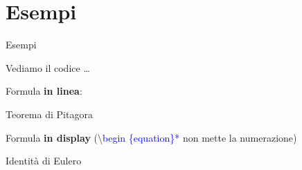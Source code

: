 \section{Esempi}
  \begin{frame}{Esempi}

    Vediamo il codice \dots

    Formula \textbf{in linea}:

    \begin{exampleblock}{Teorema di Pitagora}
      
    \end{exampleblock}

    Formula \textbf{in display} (\textbackslash \textcolor{blue}{begin \{equation\}*} non mette la numerazione)

    \begin{exampleblock}{Identità di Eulero}
      
    \end{exampleblock}

\end{frame}
